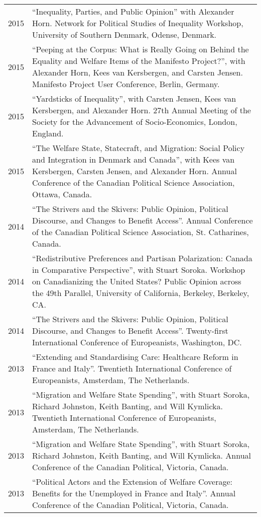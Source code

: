 \documentclass[letterpaper,fontsize=10pt]{scrartcl}
\begin{document}
\begin{tabularx}{\textwidth}{@{} l X @{} }
		2015 & ``Inequality, Parties, and Public Opinion'' with Alexander Horn. Network for Political Studies of Inequality Workshop, University of Southern Denmark, Odense, Denmark.\\[1ex]
		2015 & ``Peeping at the Corpus: What is Really Going on Behind the Equality and Welfare Items of the Manifesto Project?'', with Alexander Horn, Kees van Kersbergen, and Carsten Jensen. Manifesto Project User Conference, Berlin, Germany.\\[1ex]
		2015 & ``Yardsticks of Inequality'', with Carsten Jensen, Kees van Kersbergen, and Alexander Horn. 27th Annual Meeting of the Society for the Advancement of Socio-Economics, London, England.\\[1ex]
		2015 & ``The Welfare State, Statecraft, and Migration: Social Policy and Integration in Denmark and Canada'', with Kees van Kersbergen, Carsten Jensen, and Alexander Horn. Annual Conference of the Canadian Political Science Association, Ottawa, Canada.\\[1ex]
		2014 & ``The Strivers and the Skivers: Public Opinion, Political Discourse, and Changes to Benefit Access''. Annual Conference of the Canadian Political Science Association, St. Catharines, Canada.\\[1ex]
		2014 & ``Redistributive Preferences and Partisan Polarization: Canada in Comparative Perspective'', with Stuart Soroka. Workshop on Canadianizing the United States? Public Opinion across the 49th Parallel, University of California, Berkeley, Berkeley, CA.\\[1ex]
		2014 & ``The Strivers and the Skivers: Public Opinion, Political Discourse, and Changes to Benefit Access''. Twenty-first International Conference of Europeanists, Washington, DC.\\[1ex]
		2013 & ``Extending and Standardising Care: Healthcare Reform in France and Italy''. Twentieth International Conference of Europeanists, Amsterdam, The Netherlands.\\[1ex]
		2013 & ``Migration and Welfare State Spending'', with Stuart Soroka, Richard Johnston, Keith Banting, and Will Kymlicka. Twentieth International Conference of Europeanists, Amsterdam, The Netherlands.\\[1ex]
		2013 & ``Migration and Welfare State Spending'', with Stuart Soroka, Richard Johnston, Keith Banting, and Will Kymlicka. Annual Conference of the Canadian Political, Victoria, Canada.\\[1ex]
		2013 & ``Political Actors and the Extension of Welfare Coverage: Benefits for the Unemployed in France and Italy''. Annual Conference of the Canadian Political, Victoria, Canada.
	\end{tabularx}
\end{document}
